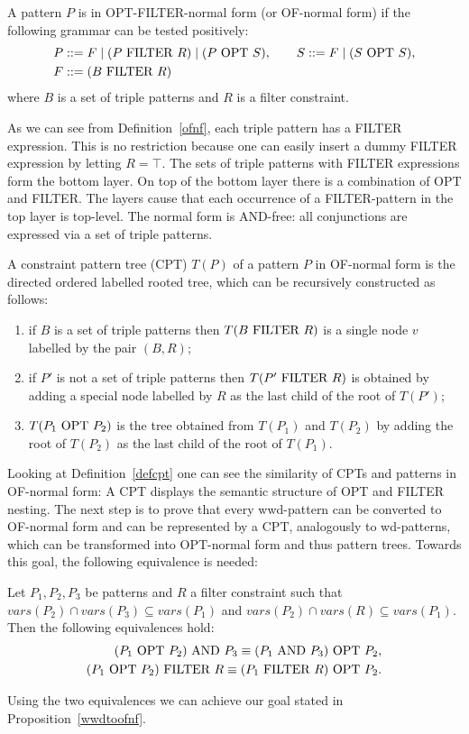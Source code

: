 \begin{definition}\label{ofnf}
	A pattern $P$ is in OPT-FILTER-normal form (or OF-normal form)
	if the following grammar can be tested positively:
	\begin{align*}
		&P ::=  F \mid (P \mbox{ FILTER } R) \mid (P \mbox{ OPT } S), \qquad S::= F\mid(S \mbox{ OPT } S),\\ 
	 &F ::=(B \mbox{ FILTER } R)
	\end{align*}
	where $B$ is a set of triple patterns and $R$ is a filter
	constraint.
\end{definition}
As we can see from Definition~\ref{ofnf}, each triple pattern has a FILTER expression. 
This is no restriction because one can easily insert a dummy FILTER expression 
by letting $R = \top$. The sets of triple patterns with FILTER expressions form the bottom layer.
On top of the bottom layer there is a combination of OPT and FILTER.
The layers cause that each occurrence of a FILTER-pattern in
the top layer is top-level. The normal form is AND-free: all conjunctions are
expressed via a set of triple patterns.

\begin{definition}\label{defcpt}
	A constraint pattern tree (CPT) $T(P)$ of a pattern $P$ in OF-normal form is
	the directed ordered labelled rooted tree, which can be recursively
	constructed as follows:
	\begin{enumerate}	
		\item if $B$ is a set of triple patterns then $T(B \mbox{ FILTER } R)$ is a single node
			$v$ labelled by the pair $(B,R)$;
		\item if $P'$ is not a set of triple patterns then $T(P' \mbox{ FILTER } R)$ is obtained
			by adding a special node labelled by $R$ as the last child of the
			root of $T(P')$;
		\item $T(P_1 \mbox{ OPT } P_2)$ is the tree obtained from $T(P_1)$ and $T(P_2)$
			by adding the root of $T(P_2)$ as the last child of the root of
			$T(P_1)$.
	\end{enumerate}
\end{definition}
Looking at Definition~\ref{defcpt} one can see the similarity of CPTs and
patterns in OF-normal form: A CPT displays the semantic structure of OPT and FILTER nesting.
The next step is to prove that every wwd-pattern can be converted to OF-normal
form and can be represented by a CPT, analogously to wd-patterns, which can be
transformed into  OPT-normal form and thus pattern trees. 
Towards this goal, the following equivalence is needed:
\begin{proposition}
	Let $P_1,P_2,P_3$ be patterns and $R$ a filter constraint such that
	$vars(P_2) \cap vars(P_3) \subseteq vars(P_1)$ and $vars(P_2) \cap vars(R)
	\subseteq vars(P_1)$. Then the following equivalences hold:
	\begin{align*}
		(P_1 \mbox{ OPT } P_2) \mbox{ AND } P_3 \equiv (P_1 \mbox{ AND } P_3) \mbox{ OPT } P_2,\\
		(P_1 \mbox{ OPT } P_2) \mbox{ FILTER } R \equiv (P_1 \mbox{ FILTER } R) \mbox{ OPT } P_2.
	\end{align*}
\end{proposition}
Using the two equivalences we can achieve our goal stated in
Proposition~\ref{wwdtoofnf}.

